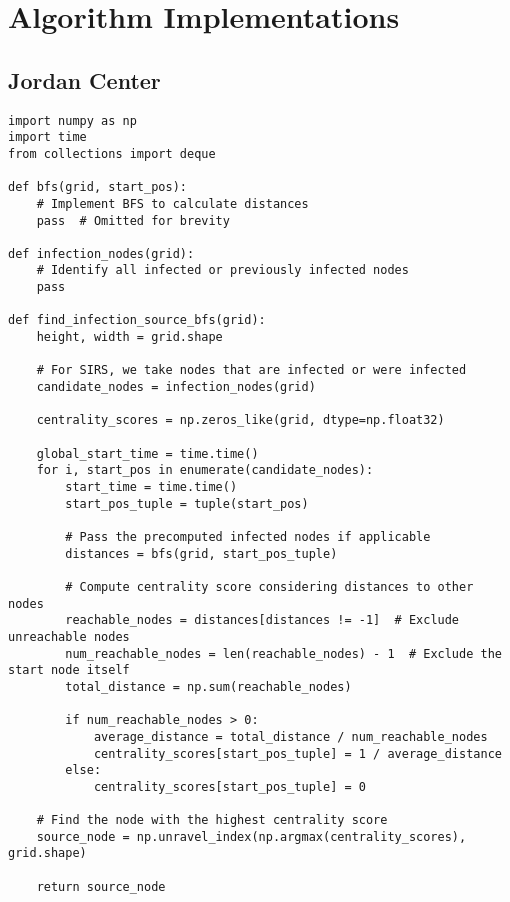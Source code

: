 \appendix
\chapter{Algorithm Implementations}

\section{Jordan Center}

\begin{lstlisting}[caption=Jordan Centrality using BFS, label=lst:jordan-center]
import numpy as np
import time
from collections import deque

def bfs(grid, start_pos):
    # Implement BFS to calculate distances
    pass  # Omitted for brevity

def infection_nodes(grid):
    # Identify all infected or previously infected nodes
    pass

def find_infection_source_bfs(grid):
    height, width = grid.shape

    # For SIRS, we take nodes that are infected or were infected
    candidate_nodes = infection_nodes(grid)

    centrality_scores = np.zeros_like(grid, dtype=np.float32)

    global_start_time = time.time()
    for i, start_pos in enumerate(candidate_nodes):
        start_time = time.time()
        start_pos_tuple = tuple(start_pos)
        
        # Pass the precomputed infected nodes if applicable
        distances = bfs(grid, start_pos_tuple)

        # Compute centrality score considering distances to other nodes
        reachable_nodes = distances[distances != -1]  # Exclude unreachable nodes
        num_reachable_nodes = len(reachable_nodes) - 1  # Exclude the start node itself
        total_distance = np.sum(reachable_nodes)
        
        if num_reachable_nodes > 0:
            average_distance = total_distance / num_reachable_nodes
            centrality_scores[start_pos_tuple] = 1 / average_distance
        else:
            centrality_scores[start_pos_tuple] = 0

    # Find the node with the highest centrality score
    source_node = np.unravel_index(np.argmax(centrality_scores), grid.shape)
    
    return source_node
\end{lstlisting}

